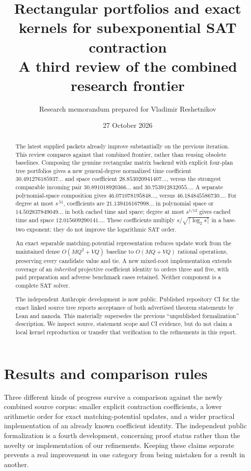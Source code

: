 \documentclass[11pt,letterpaper]{article}
\title{Rectangular portfolios and exact kernels for subexponential SAT contraction\\[5pt]\large A third review of the combined research frontier}
\author{Research memorandum prepared for Vladimir Reshetnikov}
\date{27 October 2026}
\theoremstyle{remark}\newtheorem{remark}[theorem]{Remark}
\begin{document}
\maketitle
\begin{abstract}
The latest supplied packets already improve substantially on the previous iteration. This review compares against that combined frontier, rather than reusing obsolete baselines. Composing the genuine rectangular matrix backend with explicit four-plan tree portfolios gives a new general-degree normalized time coefficient $30.491276185937\ldots$ and space coefficient $28.853020941407\ldots$, versus the strongest comparable incoming pair $30.891018920366\ldots$ and $30.753912832055\ldots$. A separate polynomial-space composition gives $46.071078195848\ldots$, versus $46.184845586730\ldots$. For degree at most $s^{.51}$, coefficients are $21.139416167998\ldots$ in polynomial space or $14.502837849049\ldots$ in both cached time and space; degree at most $s^{1/12}$ gives cached time and space $12.015609290141\ldots$. These coefficients multiply $s/\sqrt{\lceil\log_2s\rceil}$ in a base-two exponent; they do not improve the logarithmic SAT order.

An exact separable matching-potential representation reduces update work from the maintained dense $O(MQ^2+VQ)$ baseline to $O(MQ+VQ)$ rational operations, preserving every candidate value and tie. A new mixed-root implementation extends coverage of an \emph{inherited} projective coefficient identity to orders three and five, with paid preparation and adverse benchmark cases retained. Neither component is a complete SAT solver.

The independent Anthropic development is now public. Published repository CI for the exact linked source tree reports acceptance of both advertised theorem statements by Lean and nanoda. This materially supersedes the previous ``unpublished formalization'' description. We inspect source, statement scope and CI evidence, but do not claim a local kernel reproduction or transfer that verification to the refinements in this report.
\end{abstract}
\newpage
\setcounter{tocdepth}{1}
\begingroup
\makeatletter{}\makeatother
\tableofcontents
\endgroup
\newpage

\section{Results and comparison rules}
\label{sec:results}
Three different kinds of progress survive a comparison against the newly combined source corpus: smaller explicit contraction coefficients, a lower arithmetic order for exact matching-potential updates, and a wider practical implementation of an already known coefficient identity. The independent public formalization is a fourth development, concerning proof status rather than the novelty or implementation of our refinements. Keeping these claims separate prevents a real improvement in one category from being mistaken for a result in another.
\end{document}
